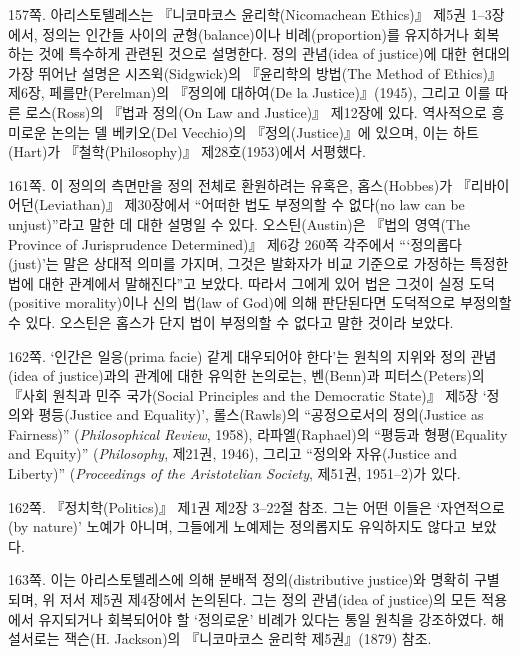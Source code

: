 {\footnotesize
\noteentry 157쪽.  아리스토텔레스는 『니코마코스 윤리학(Nicomachean Ethics)』 제5권
1--3장에서, 정의는 인간들 사이의 균형(balance)이나 비례(proportion)를
유지하거나 회복하는 것에 특수하게 관련된 것으로 설명한다. 정의 관념(idea
of justice)에 대한 현대의 가장 뛰어난 설명은 시즈윅(Sidgwick)의
『윤리학의 방법(The Method of Ethics)』 제6장, 페를만(Perelman)의
『정의에 대하여(De la Justice)』(1945), 그리고 이를 따른 로스(Ross)의
『법과 정의(On Law and Justice)』 제12장에 있다. 역사적으로 흥미로운
논의는 델 베키오(Del Vecchio)의 『정의(Justice)』에 있으며, 이는
하트(Hart)가 『철학(Philosophy)』 제28호(1953)에서 서평했다.

\noteentry 161쪽.  이 정의의 측면만을 정의 전체로
환원하려는 유혹은, 홉스(Hobbes)가 『리바이어던(Leviathan)』 제30장에서
“어떠한 법도 부정의할 수 없다(no law can be unjust)”라고 말한 데 대한
설명일 수 있다. 오스틴(Austin)은 『법의 영역(The Province of
Jurisprudence Determined)』 제6강 260쪽 각주에서 “‘정의롭다(just)’는
말은 상대적 의미를 가지며, 그것은 발화자가 비교 기준으로 가정하는 특정한
법에 대한 관계에서 말해진다”고 보았다. 따라서 그에게 있어 법은 그것이
실정 도덕(positive morality)이나 신의 법(law of God)에 의해 판단된다면
도덕적으로 부정의할 수 있다. 오스틴은 홉스가 단지 법이
 부정의할 수 없다고 말한 것이라 보았다.

\noteentry 162쪽.  ‘인간은 일응(prima facie) 같게
대우되어야 한다’는 원칙의 지위와 정의 관념(idea of justice)과의 관계에
대한 유익한 논의로는, 벤(Benn)과 피터스(Peters)의 『사회 원칙과 민주
국가(Social Principles and the Democratic State)』 제5장 ‘정의와
평등(Justice and Equality)’, 롤스(Rawls)의 “공정으로서의 정의(Justice
as Fairness)” (\emph{Philosophical Review}, 1958), 라파엘(Raphael)의
“평등과 형평(Equality and Equity)” (\emph{Philosophy}, 제21권, 1946),
그리고 “정의와 자유(Justice and Liberty)” (\emph{Proceedings of the
Aristotelian Society}, 제51권, 1951--2)가 있다.

\noteentry 162쪽.  『정치학(Politics)』 제1권 제2장
3--22절 참조. 그는 어떤 이들은 ‘자연적으로(by nature)’ 노예가 아니며,
그들에게 노예제는 정의롭지도 유익하지도 않다고 보았다.

\noteentry 163쪽.  이는 아리스토텔레스에 의해
분배적 정의(distributive justice)와 명확히 구별되며, 위 저서 제5권
제4장에서 논의된다. 그는 정의 관념(idea of justice)의 모든 적용에서
유지되거나 회복되어야 할 ‘정의로운’ 비례가 있다는 통일 원칙을
강조하였다. 해설서로는 잭슨(H. Jackson)의 『니코마코스 윤리학
제5권』(1879) 참조.

}
